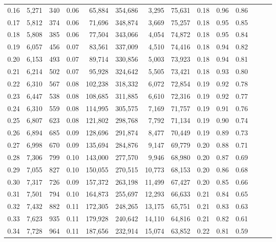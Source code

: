 \begin{tabular}{rrrrrrrrrrrrrr}
0.16 &  5,271 &    340 &  0.06 &   65,884 &  354,686 &   3,295 &  75,631 &  0.18 &  0.96 &      0.86 \\
0.17 &  5,812 &    374 &  0.06 &   71,696 &  348,874 &   3,669 &  75,257 &  0.18 &  0.95 &      0.85 \\
0.18 &  5,808 &    385 &  0.06 &   77,504 &  343,066 &   4,054 &  74,872 &  0.18 &  0.95 &      0.84 \\
0.19 &  6,057 &    456 &  0.07 &   83,561 &  337,009 &   4,510 &  74,416 &  0.18 &  0.94 &      0.82 \\
0.20 &  6,153 &    493 &  0.07 &   89,714 &  330,856 &   5,003 &  73,923 &  0.18 &  0.94 &      0.81 \\
0.21 &  6,214 &    502 &  0.07 &   95,928 &  324,642 &   5,505 &  73,421 &  0.18 &  0.93 &      0.80 \\
0.22 &  6,310 &    567 &  0.08 &  102,238 &  318,332 &   6,072 &  72,854 &  0.19 &  0.92 &      0.78 \\
0.23 &  6,447 &    538 &  0.08 &  108,685 &  311,885 &   6,610 &  72,316 &  0.19 &  0.92 &      0.77 \\
0.24 &  6,310 &    559 &  0.08 &  114,995 &  305,575 &   7,169 &  71,757 &  0.19 &  0.91 &      0.76 \\
0.25 &  6,807 &    623 &  0.08 &  121,802 &  298,768 &   7,792 &  71,134 &  0.19 &  0.90 &      0.74 \\
0.26 &  6,894 &    685 &  0.09 &  128,696 &  291,874 &   8,477 &  70,449 &  0.19 &  0.89 &      0.73 \\
0.27 &  6,998 &    670 &  0.09 &  135,694 &  284,876 &   9,147 &  69,779 &  0.20 &  0.88 &      0.71 \\
0.28 &  7,306 &    799 &  0.10 &  143,000 &  277,570 &   9,946 &  68,980 &  0.20 &  0.87 &      0.69 \\
0.29 &  7,055 &    827 &  0.10 &  150,055 &  270,515 &  10,773 &  68,153 &  0.20 &  0.86 &      0.68 \\
0.30 &  7,317 &    726 &  0.09 &  157,372 &  263,198 &  11,499 &  67,427 &  0.20 &  0.85 &      0.66 \\
0.31 &  7,501 &    794 &  0.10 &  164,873 &  255,697 &  12,293 &  66,633 &  0.21 &  0.84 &      0.65 \\
0.32 &  7,432 &    882 &  0.11 &  172,305 &  248,265 &  13,175 &  65,751 &  0.21 &  0.83 &      0.63 \\
0.33 &  7,623 &    935 &  0.11 &  179,928 &  240,642 &  14,110 &  64,816 &  0.21 &  0.82 &      0.61 \\
0.34 &  7,728 &    964 &  0.11 &  187,656 &  232,914 &  15,074 &  63,852 &  0.22 &  0.81 &      0.59 \\

\end{tabular}
